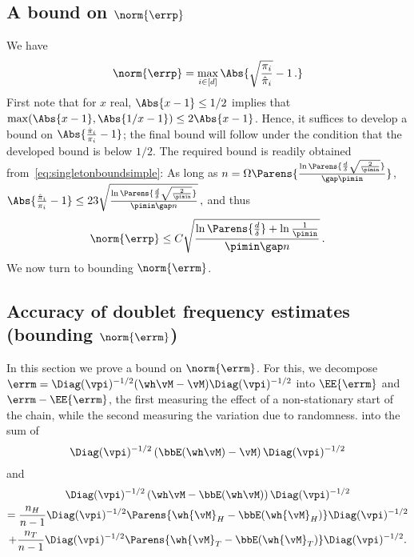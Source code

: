 \subsection{A bound on $\norm{\errp}$}
We have
\begin{align*}
  \norm{\errp}
  = \max_{i\in[d]} \Abs{
    \sqrt{\frac{\pi_i}{\hat\pi_i}} - 1\,.
  }
\end{align*}
First note that for $x$ real, $\Abs{x-1}\le 1/2$ implies that $\max(\Abs{x-1},\Abs{1/x-1}) \le 2 \Abs{x-1}$.
Hence, it suffices to develop a bound on $ \Abs{ \frac{\hat\pi_i}{\pi_i} - 1 }$;
the final bound will follow under the condition that the developed bound is below $1/2$.
The required bound is readily obtained from~\eqref{eq:singletonboundsimple}:
As long as $n = \Omega \Parens{
	\frac{\ln\Parens{\frac{d}\delta\sqrt{\frac{2}{\pimin}}}
           }{\gap \pimin} }$, 
$
\Abs{\frac{\hat{\pi}_i}{\pi_i}-1}
\le
23 \sqrt{  
	\frac{\ln\Parens{\frac{d}\delta\sqrt{\frac{2}{\pimin}}}
           }{\pimin\gap n}
       }\,,
$
and thus
\begin{align}
\label{eq:singletonbound}
\norm{\errp} \le C \sqrt{ \frac{\ln\Parens{\frac{d}\delta} + \ln \frac{1}{\pimin} }{\pimin\gap n}} \,.
\end{align}
We now turn to bounding  $\norm{\errm}$.


\subsection{Accuracy of doublet frequency estimates (bounding $\norm{\errm}$)}
\label{sec:pairwise}
In this section we prove a bound on $\norm{\errm}$.
For this, we decompose
$\errm = \Diag(\vpi)^{-1/2}(\wh\vM-\vM)\Diag(\vpi)^{-1/2} $
into $\EE{\errm}$ and 
$
\errm-\EE{\errm}%
$, the first measuring the effect of a non-stationary start of the chain,
while the second measuring the variation due to randomness.
into the sum of
\[
  \Diag(\vpi)^{-1/2}
  \left(\bbE( \wh\vM )- \vM\right)
  \Diag(\vpi)^{-1/2}
\]
and
\begin{multline*}
  \Diag(\vpi)^{-1/2} \left(\wh\vM- \bbE(\wh\vM)\right) \Diag(\vpi)^{-1/2}
  \\
  =
  \frac{n_H}{n-1}
  \Diag(\vpi)^{-1/2}\Parens{
    \wh{\vM}_H - \bbE(\wh{\vM}_H)
  }\Diag(\vpi)^{-1/2}
  \\
  + \frac{n_T}{n-1}
  \Diag(\vpi)^{-1/2}\Parens{
    \wh{\vM}_T - \bbE(\wh{\vM}_T)
  }\Diag(\vpi)^{-1/2}
  .
\end{multline*}
\fi
